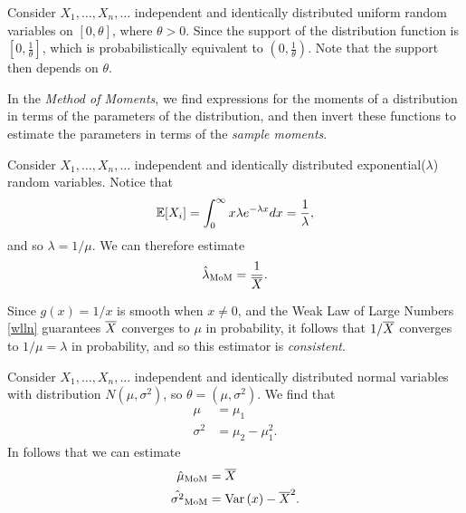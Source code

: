 \begin{exmp}
    Consider $X_1, \ldots, X_n, \ldots$ independent and identically distributed uniform random variables on $[0, \theta]$, where $\theta > 0$. Since the support of the distribution function is $[0, \frac{1}{\theta}]$, which is probabilistically equivalent to $(0, \frac{1}{\theta})$. Note that the support then depends on $\theta$.
\end{exmp}

\begin{defn}
    In the \emph{Method of Moments}, we find expressions for the moments of a distribution in terms of the parameters of the distribution, and then invert these functions to estimate the parameters in terms of the \emph{sample moments}.
\end{defn}

\begin{exmp}
    Consider $X_1, \ldots, X_n, \ldots$ independent and identically distributed exponential($\lambda$) random variables. Notice that
    \begin{align*}
        \operatorname{\mathbb{E}}\!\left[{X_i}\right] = \int_{0}^{\infty}x\lambda e^{-\lambda x}dx = \frac{1}{\lambda},
    \end{align*}
    and so $\lambda = 1/\mu$. We can therefore estimate
    \begin{align*}
        \hat{\lambda}_{\textrm{MoM}} = \frac{1}{\overline{X}}.
    \end{align*}

    Since $g(x) = 1/x$ is smooth when $x \neq 0$, and the Weak Law of Large Numbers \ref{wlln} guarantees $\overline{X}$ converges to $\mu$ in probability, it follows that $1/\overline{X}$ converges to $1/\mu = \lambda$ in probability, and so this estimator is \emph{consistent}.
\end{exmp}

\begin{exmp}
    Consider $X_1, \ldots, X_n, \ldots$ independent and identically distributed normal variables with distribution $N(\mu, \sigma^2)$, so $\theta = (\mu, \sigma^2)$. We find that
    \begin{align*}
        \mu &= \mu_1 \\
        \sigma^2 &= \mu_2 - \mu_1^2.
    \end{align*}
    In follows that we can estimate
    \begin{align*}
        \hat{\mu}_{\textrm{MoM}} &= \overline{X} \\
        \hat{\sigma^2}_{\textrm{MoM}} &= \operatorname{Var}\left(x\right) - \overline{X}^2.
    \end{align*}
\end{exmp}

